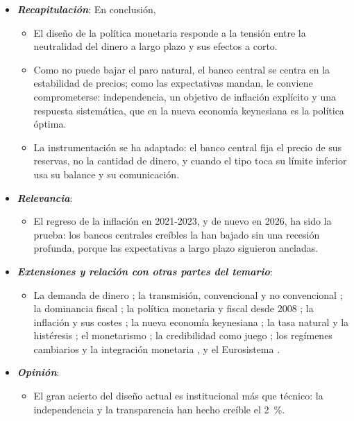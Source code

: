 \documentclass[11pt]{article}
\begin{document}
\begin{itemize}
\item \textbf{\emph{Recapitulación}}: En conclusión,
  \begin{itemize}
  \item El diseño de la política monetaria responde a la tensión entre la neutralidad del dinero a largo plazo y sus efectos a corto.

  \item Como no puede bajar el paro natural, el banco central se centra en la estabilidad de precios; como las expectativas mandan, le conviene comprometerse: independencia, un objetivo de inflación explícito y una respuesta sistemática, que en la nueva economía keynesiana es la política óptima.

  \item La instrumentación se ha adaptado: el banco central fija el precio de sus reservas, no la cantidad de dinero, y cuando el tipo toca su límite inferior usa su balance y su comunicación.
  \end{itemize}
\item \textbf{\emph{Relevancia}}:
  \begin{itemize}
  \item El regreso de la inflación en 2021-2023, y de nuevo en 2026, ha sido la prueba: los bancos centrales creíbles la han bajado sin una recesión profunda, porque las expectativas a largo plazo siguieron ancladas.
  \end{itemize}
\item \textbf{\emph{Extensiones y relación con otras partes del temario}}:
  \begin{itemize}
  \item La demanda de dinero ; la transmisión, convencional y no convencional ; la dominancia fiscal ; la política monetaria y fiscal desde 2008 ; la inflación y sus costes ; la nueva economía keynesiana ; la tasa natural y la histéresis ; el monetarismo ; la credibilidad como juego ; los regímenes cambiarios y la integración monetaria  , y el Eurosistema .
  \end{itemize}
\item \textbf{\emph{Opinión}}:
  \begin{itemize}
  \item El gran acierto del diseño actual es institucional más que técnico: la independencia y la transparencia han hecho creíble el 2~\%.


\end{itemize}
\end{itemize}
\end{document}
